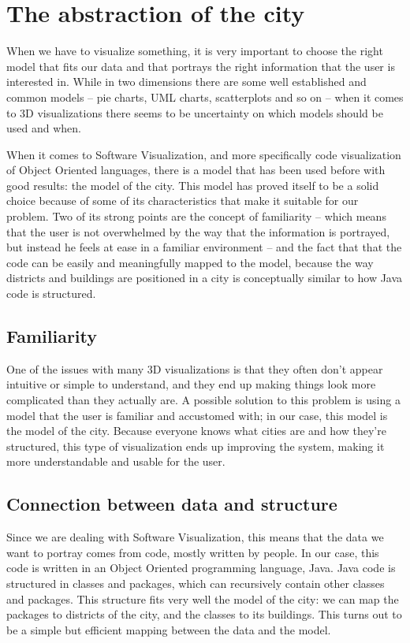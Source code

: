 \documentclass[]{usiinfbachelorproject}
\begin{document}
\section{The abstraction of the city} \label{The abstraction of the city}
When we have to visualize something, it is very important to choose the right model that fits our data and that portrays the right information that the user is interested in. While in two dimensions there are some well established and common models -- pie charts, UML charts, scatterplots and so on -- when it comes to 3D visualizations there seems to be uncertainty on which models should be used and when.

When it comes to Software Visualization, and more specifically code visualization of Object Oriented languages, there is a model that has been used before\cite{Wett07b} \cite{Wett2008b} \cite{Wett2008a} with good results: the model of the city. This model has proved itself to be a solid choice because of some of its characteristics that make it suitable for our problem. Two of its strong points are the concept of familiarity -- which means that the user is not overwhelmed by the way that the information is portrayed, but instead he feels at ease in a familiar environment -- and the fact that that the code can be easily and meaningfully mapped to the model, because the way districts and buildings are positioned in a city is conceptually similar to how Java code is structured.

\subsection{Familiarity} \label{Familiarity}
One of the issues with many 3D visualizations is that they often don't appear intuitive or simple to understand, and they end up making things look more complicated than they actually are. A possible solution to this problem is using a model that the user is familiar and accustomed with; in our case, this model is the model of the city. Because everyone knows what cities are and how they're structured, this type of visualization ends up improving the system, making it more understandable and usable for the user.

\subsection{Connection between data and structure} \label{Connection between data and structure}
Since we are dealing with Software Visualization, this means that the data we want to portray comes from code, mostly written by people. In our case, this code is written in an Object Oriented programming language, Java.
Java code is structured in classes and packages, which can recursively contain other classes and packages.
This structure fits very well the model of the city: we can map the packages to districts of the city, and the classes to its buildings. This turns out to be a simple but efficient mapping between the data and the model.
\end{document}
